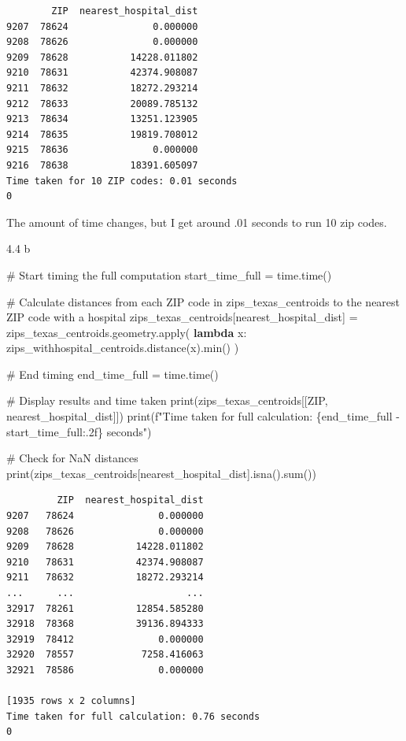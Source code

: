 \documentclass[
  letterpaper,
  DIV=11,
  numbers=noendperiod]{scrartcl}
\newenvironment{Shaded}{\begin{snugshade}}{\end{snugshade}}
\newcommand{\BuiltInTok}[1]{\textcolor[rgb]{0.00,0.23,0.31}{#1}}
\newcommand{\CommentTok}[1]{\textcolor[rgb]{0.37,0.37,0.37}{#1}}
\newcommand{\KeywordTok}[1]{\textcolor[rgb]{0.00,0.23,0.31}{\textbf{#1}}}
\newcommand{\NormalTok}[1]{\textcolor[rgb]{0.00,0.23,0.31}{#1}}
\newcommand{\OperatorTok}[1]{\textcolor[rgb]{0.37,0.37,0.37}{#1}}
\newcommand{\SpecialCharTok}[1]{\textcolor[rgb]{0.37,0.37,0.37}{#1}}
\newcommand{\SpecialStringTok}[1]{\textcolor[rgb]{0.13,0.47,0.30}{#1}}
\newcommand{\StringTok}[1]{\textcolor[rgb]{0.13,0.47,0.30}{#1}}
\begin{document}
\begin{verbatim}
        ZIP  nearest_hospital_dist
9207  78624               0.000000
9208  78626               0.000000
9209  78628           14228.011802
9210  78631           42374.908087
9211  78632           18272.293214
9212  78633           20089.785132
9213  78634           13251.123905
9214  78635           19819.708012
9215  78636               0.000000
9216  78638           18391.605097
Time taken for 10 ZIP codes: 0.01 seconds
0
\end{verbatim}

The amount of time changes, but I get around .01 seconds to run 10 zip
codes.

4.4 b

\begin{Shaded}
\begin{Highlighting}[]
\CommentTok{\# Start timing the full computation}
\NormalTok{start\_time\_full }\OperatorTok{=}\NormalTok{ time.time()}

\CommentTok{\# Calculate distances from each ZIP code in zips\_texas\_centroids to the nearest ZIP code with a hospital}
\NormalTok{zips\_texas\_centroids[}\StringTok{\textquotesingle{}nearest\_hospital\_dist\textquotesingle{}}\NormalTok{] }\OperatorTok{=}\NormalTok{ zips\_texas\_centroids.geometry.}\BuiltInTok{apply}\NormalTok{(}
    \KeywordTok{lambda}\NormalTok{ x: zips\_withhospital\_centroids.distance(x).}\BuiltInTok{min}\NormalTok{()}
\NormalTok{)}

\CommentTok{\# End timing}
\NormalTok{end\_time\_full }\OperatorTok{=}\NormalTok{ time.time()}

\CommentTok{\# Display results and time taken}
\BuiltInTok{print}\NormalTok{(zips\_texas\_centroids[[}\StringTok{\textquotesingle{}ZIP\textquotesingle{}}\NormalTok{, }\StringTok{\textquotesingle{}nearest\_hospital\_dist\textquotesingle{}}\NormalTok{]])}
\BuiltInTok{print}\NormalTok{(}\SpecialStringTok{f"Time taken for full calculation: }\SpecialCharTok{\{}\NormalTok{end\_time\_full }\OperatorTok{{-}}\NormalTok{ start\_time\_full}\SpecialCharTok{:.2f\}}\SpecialStringTok{ seconds"}\NormalTok{)}

\CommentTok{\# Check for NaN distances}
\BuiltInTok{print}\NormalTok{(zips\_texas\_centroids[}\StringTok{\textquotesingle{}nearest\_hospital\_dist\textquotesingle{}}\NormalTok{].isna().}\BuiltInTok{sum}\NormalTok{())}
\end{Highlighting}
\end{Shaded}

\begin{verbatim}
         ZIP  nearest_hospital_dist
9207   78624               0.000000
9208   78626               0.000000
9209   78628           14228.011802
9210   78631           42374.908087
9211   78632           18272.293214
...      ...                    ...
32917  78261           12854.585280
32918  78368           39136.894333
32919  78412               0.000000
32920  78557            7258.416063
32921  78586               0.000000

[1935 rows x 2 columns]
Time taken for full calculation: 0.76 seconds
0
\end{verbatim}
\end{document}
